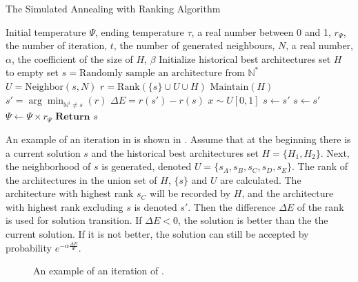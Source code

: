\documentclass[sigconf]{acmart}
\begin{document}
    \begin{algorithm}[h]
        \caption{The Simulated Annealing with Ranking Algorithm}\label{alg:SA}
        \begin{algorithmic}[1]
            \Parameter Initial temperature $\Psi$, ending temperature $\tau$, a real number between 0 and 1, $r_\Psi$, the number of iteration, $t$, the number of generated neighbours, $N$, a real number, $\alpha$, the coefficient of the size of $H$, $\beta$
            \State Initialize historical best architectures set $H$ to empty set
            \State $s=\text{Randomly sample an architecture from }\mathbb N^*$
            \While{$\Psi>\tau$}
                    \State $U = \text{Neighbor}(s, N)$
                    \State $r=\text{Rank}(\{s\}\cup U\cup H)$
                    \State $\text{Maintain}(H)$
                    \State $s'=\arg\min_{\mathbb N^i\neq s}(r)$
                    \State $\Delta E=r(s')-r(s)$
                    \State $x\sim U[0,1]$
                        \State $s\leftarrow s'$
                            \State $s\leftarrow s'$
                    \EndIf
                \EndFor
                \State $\Psi\leftarrow \Psi\times r_\Psi$
            \EndWhile
            \State $\textbf{Return }s$ 
        \end{algorithmic}
    \end{algorithm}

    An example of an iteration in \palg{} is shown in . 
    Assume that at the beginning there is a current solution $s$ and the historical best 
    architectures set $H=\{H_1,H_2\}$. Next, the neighborhood of $s$ is generated, 
    denoted $U=\{s_A,s_B,s_C,s_D,s_E\}$. The rank of the architectures in the union 
    set of $H$, $\{s\}$ and $U$ are calculated. The architecture with highest rank 
    $s_C$ will be recorded by $H$, and the architecture with highest rank excluding 
    $s$ is denoted $s'$. Then the difference $\Delta E$ of the rank is used for 
    solution transition. If $\Delta E<0$, the solution is better than the the current 
    solution. If it is not better, the solution can still be accepted by probability 
    $e^{-\alpha\frac{\Delta E}{\Psi}}$. 
    
    \begin{figure}[htb]
        \begin{center}
            \caption{An example of an iteration of \palg{}.}
            \label{fig:SA-rank-iteration}
        \end{center}
    \end{figure}
\end{document}
